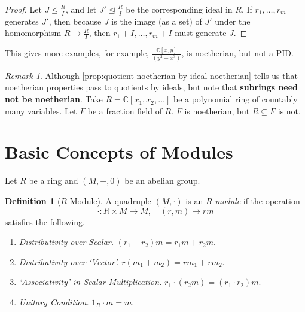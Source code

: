 \documentclass{article}
\theoremstyle{definition}
\newtheorem{definition}[theorem]{Definition}
\theoremstyle{remark}
\newtheorem{remark}[theorem]{Remark}
\newcommand{\pqty}[1]{\left(#1\right)}
\newcommand{\bqty}[1]{\left[#1\right]}
\newcommand{\flatfrac}[2]{\frac{#1}{#2}}
\newcommand{\function}[5]{#1:#2\to #3,\quad #4\mapsto #5}
\newcommand{\subring}{\subseteq}
\newcommand{\idealsub}{\trianglelefteq}
\newcommand{\CC}{\mathbb{C}}
\begin{document}
\begin{proof}
    Let \(J \idealsub \flatfrac{R}{I}\), and let \(J' \idealsub \flatfrac{R}{I}\) be the corresponding ideal in \(R\). If \(r_1, \ldots, r_m\) generates \(J'\), then because \(J\) is the image (as a set) of \(J'\) under the homomorphism \(R \to \flatfrac{R}{I}\), then \(r_1 + I, \ldots, r_m + I\) must generate \(J\).
\end{proof}

This gives more examples, for example, \(\flatfrac{\CC\bqty{x, y}}{\pqty{y^2 - x^3}}\), is noetherian, but not a PID.

\begin{remark}
    Although \autoref{prop:quotient-noetherian-by-ideal-noetherian} tells us that noetherian properties pass to quotients by ideals, but note that \textbf{subrings need not be noetherian}. Take \(R = \CC\bqty{x_1, x_2, \ldots}\) be a polynomial ring of countably many variables. Let \(F\) be a fraction field of \(R\). \(F\) is noetherian, but \(R \subring F\) is not.
\end{remark}

\section{Basic Concepts of Modules}

Let \(R\) be a ring and \(\pqty{M, +, 0}\) be an abelian group.

\begin{definition}[\(R\)-Module]
    \label{def:r-module}%
    A quadruple \(\pqty{M, \cdot}\) is an \emph{\(R\)-module} if the operation
    \[
        \function{\cdot}{R \times M}{M}{\pqty{r, m}}{rm}
    \]
    satisfies the following.

    \begin{enumerate}
        \item \textit{Distributivity over Scalar.} \(\pqty{r_1 + r_2} m = r_1 m + r_2 m\).
        \item \textit{Distributivity over `Vector'.} \(r \pqty{m_1 + m_2} = r m_1 + r m_2\).
        \item \textit{`Associativity' in Scalar Multiplication.} \(r_1 \cdot \pqty{r_2 m} = \pqty{r_1 \cdot r_2} m\).
        \item \textit{Unitary Condition.} \(1_{R} \cdot m = m\).
    \end{enumerate}
\end{definition}
\end{document}
